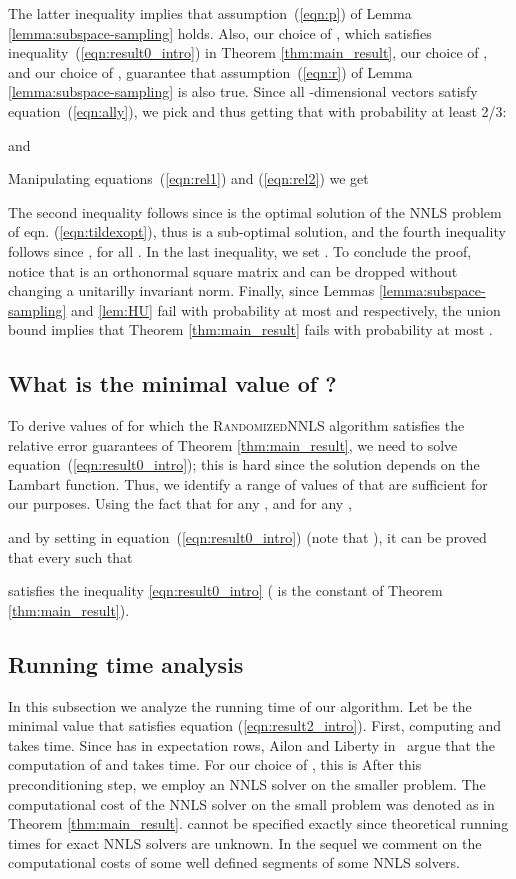 \documentclass[11pt]{article}
\begin{document}
The latter inequality implies that assumption~(\ref{eqn:p}) of
Lemma \ref{lemma:subspace-sampling} holds. Also, our choice of
, which satisfies inequality~(\ref{eqn:result0_intro}) in
Theorem \ref{thm:main_result}, our choice of , and our
choice of , guarantee that assumption~(\ref{eqn:r}) of
Lemma \ref{lemma:subspace-sampling}
is also true. Since all -dimensional vectors  satisfy  equation~(\ref{eqn:ally}), we pick  and  thus getting that with probability at least 2/3:

and

Manipulating equations~(\ref{eqn:rel1}) and (\ref{eqn:rel2}) we
get

The second inequality follows since  is the
optimal solution of the NNLS problem of eqn.
(\ref{eqn:tildexopt}), thus  is a sub-optimal solution,
and the fourth inequality follows since
, for all . In the last
inequality, we set . To conclude the
proof, notice that  is an orthonormal square matrix and can
be dropped without changing a unitarilly invariant norm. Finally,
since Lemmas \ref{lemma:subspace-sampling} and \ref{lem:HU} fail
with probability at most  and  respectively, the union
bound implies that Theorem \ref{thm:main_result} fails with
probability at most .



\subsection{What is the minimal value of  ?}
\label{sec:optr} To derive values of  for which the
\textsc{RandomizedNNLS} algorithm satisfies the relative error
guarantees of Theorem \ref{thm:main_result}, we need to solve
equation~(\ref{eqn:result0_intro}); this is hard since the
solution depends on the Lambart  function. Thus, we identify a
range of values of  that are sufficient for our purposes. Using
the fact that for any , and for any ,

and by setting  in
equation~(\ref{eqn:result0_intro}) (note that ), it can be proved that every 
such that

satisfies the inequality \ref{eqn:result0_intro} ( is the
constant of Theorem \ref{thm:main_result}).

\subsection{Running time analysis}
\label{sec:time} In this subsection we analyze the running time of
our algorithm. Let  be the minimal value that satisfies
equation (\ref{eqn:result2_intro}). First, computing  and 
takes  time. Since  has in expectation  rows,
Ailon and Liberty in~\cite{AL08} argue that the computation of
 and  takes  time. For our
choice of , this is
 After
this preconditioning step, we employ an NNLS solver on the smaller
problem. The computational cost of the NNLS solver on the small
problem was denoted as  in Theorem
\ref{thm:main_result}.  cannot be specified exactly
since theoretical running times for exact NNLS solvers are
unknown. In the sequel we comment on the computational costs of
some well defined segments of some NNLS solvers.
\end{document}
